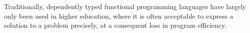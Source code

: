 Traditionally, dependently typed functional programming languages have largely only been used in higher education, where it is often acceptable to express a solution to a problem precisely, at a consequent loss in program efficiency.
